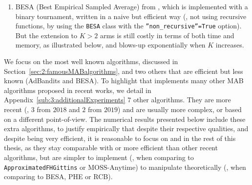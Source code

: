\begin{enumerate}
    \item
    BESA (Best Empirical Sampled Average) from \cite{Baransi2014},
    which is implemented with a binary tournament, written in a naive but efficient way
    (\ie, not using recursive functions, by using the \texttt{BESA} class with the \texttt{''non\_recursive''=True} option).
    But the extension to $K>2$ arms is still costly in terms of both time and memory, as illustrated below, and blows-up exponentially  when $K$ increases.
\end{enumerate}

We focus on the most well known algorithms, discussed in Section~\ref{sec:2:famousMABalgorithms}, and two others that are efficient but less known (AdBandits and BESA).
To highlight that \SMPyBandits{} implements many other MAB algorithms proposed in recent works, we detail in Appendix~\ref{sub:3:additionalExperiments} $7$ other algorithms.
They are more recent (\eg, $3$ from $2018$ and $2$ from $2019$) and are usually more complex, or based on a different point-of-view.
The numerical results presented below include these extra algorithms, to justify empirically that despite their respective qualities, and despite being very efficient, it is reasonable to focus on \UCB{} and \klUCB{} in the rest of this thesis, as they stay comparable with or more efficient than other recent algorithms, but are simpler to implement (\eg, when comparing \UCB{} to \texttt{ApproximatedFHGittins} or $\mathrm{MOSS}$-$\mathrm{Anytime}$) to manipulate theoretically (\eg, when comparing \klUCB{} to BESA, PHE or RCB).


